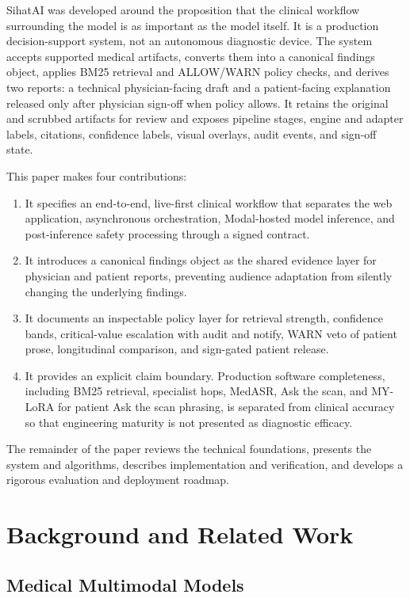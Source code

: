 \documentclass[conference]{IEEEtran}
\begin{document}
SihatAI was developed around the proposition that the clinical workflow surrounding the model is as important as the model itself. It is a production decision-support system, not an autonomous diagnostic device. The system accepts supported medical artifacts, converts them into a canonical findings object, applies BM25 retrieval and ALLOW/WARN policy checks, and derives two reports: a technical physician-facing draft and a patient-facing explanation released only after physician sign-off when policy allows. It retains the original and scrubbed artifacts for review and exposes pipeline stages, engine and adapter labels, citations, confidence labels, visual overlays, audit events, and sign-off state.

This paper makes four contributions:

\begin{enumerate}
    \item It specifies an end-to-end, live-first clinical workflow that separates the web application, asynchronous orchestration, Modal-hosted model inference, and post-inference safety processing through a signed contract.
    \item It introduces a canonical findings object as the shared evidence layer for physician and patient reports, preventing audience adaptation from silently changing the underlying findings.
    \item It documents an inspectable policy layer for retrieval strength, confidence bands, critical-value escalation with audit and notify, WARN veto of patient prose, longitudinal comparison, and sign-gated patient release.
    \item It provides an explicit claim boundary. Production software completeness, including BM25 retrieval, specialist hops, MedASR, Ask the scan, and MY-LoRA for patient Ask the scan phrasing, is separated from clinical accuracy so that engineering maturity is not presented as diagnostic efficacy.
\end{enumerate}

The remainder of the paper reviews the technical foundations, presents the system and algorithms, describes implementation and verification, and develops a rigorous evaluation and deployment roadmap.

\section{Background and Related Work}

\subsection{Medical Multimodal Models}
\end{document}

